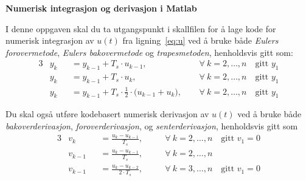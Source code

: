 \item
{\bf Numerisk integrasjon og derivasjon i Matlab}
\label{oppg:b}

I denne oppgaven skal du ta
utgangspunkt   i skallfilen  for å  
lage kode for numerisk
integrasjon av
$u(t)$ fra ligning~\eqref{eq:u} ved å bruke både {\it Eulers  forovermetode},
  {\it  Eulers  bakovermetode} og {\it  trapes\-metoden}, henholdsvis gitt som:
  \begin{alignat}{3}
    &y_{k} && =  y_{k-1} +
              T_s {\cdot} u_{k-1}, 
    &&~~ \forall ~  k{=}2,\ldots,n \quad \text{gitt } y_{1} \label{eq:ef}\\
    &y_{k} && =  y_{k-1} +
              T_s {\cdot} u_{k}, 
    &&~~\forall ~  k{=}2,\ldots,n\quad \text{gitt } y_{1} \label{eq:eb}\\
    &y_{k} && =  y_{k-1} +
              T_s {\cdot} \frac{1}{2}{\cdot} \bigl(u_{k-1} + u_{k} \bigr),
    &&~~\forall ~  k{=}2,\ldots,n \quad \text{gitt } y_{1} \label{eq:tr}
  \end{alignat}
  
  
  Du skal også utføre kodebasert numerisk derivasjon   av
$u(t)$ ved å bruke både {\it bakoverderivasjon}, 
  {\it  foroverderivasjon}, 
  og {\it  senter\-derivasjon}, henholdsvis  gitt som 
  \begin{alignat}{3}
    & v_{k} && =\frac{u_{k}-u_{k-1}}{T_s}, &&\quad  \forall ~
            k{=}2,\ldots,n \quad \text{gitt } v_{1}=0 \label{eq:bak}\\
    & v_{k-1} && =\frac{u_{k}-u_{k-1}}{T_s},&&\quad\forall ~ k{=}2,\ldots,n\\
    & v_{k-1} && =\frac{u_{k}-u_{k-2}}{2{\cdot}T_s}, &&\quad\forall ~
              k{=}3,\ldots,n \quad \text{gitt } v_{1}=0
  \end{alignat}
   
